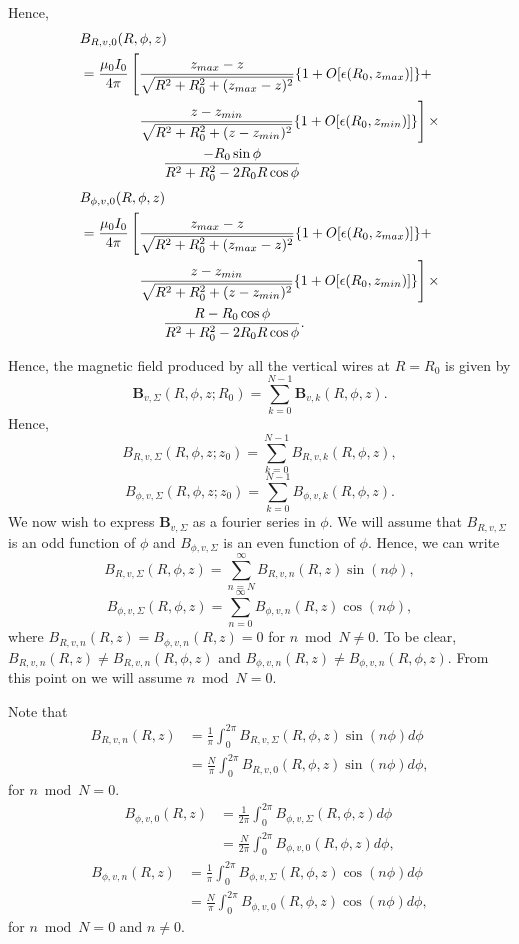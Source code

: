 \documentclass{article}
\let\vec\mathbf
\begin{document}
Hence,
\[
\begin{aligned}
    &B_{R,v,0}(R, \phi, z) \\
   &=\frac{\mu_0 I_0}{4\pi}\left[\frac{z_{max}-z}{\sqrt{R^2+R_0^2+(z_{max}-z)^2}}\qty{1+O[\epsilon(R_0, z_{max})]} + \right.\\
    &\qquad\qquad\left.\frac{z-z_{min}}{\sqrt{R^2+R_0^2+(z-z_{min})^2}}\qty{1+O[\epsilon(R_0, z_{min})]}\right]\times\\
    &\qquad\qquad\qquad\frac{-R_0\sin\phi}{R^2+R_0^2-2R_0R\cos\phi} \\
\end{aligned}
\]
\[
\begin{aligned}
    &B_{\phi,v,0}(R, \phi, z) \\
   &=\frac{\mu_0 I_0}{4\pi}\left[\frac{z_{max}-z}{\sqrt{R^2+R_0^2+(z_{max}-z)^2}}\qty{1+O[\epsilon(R_0, z_{max})]} + \right.\\
    &\qquad\qquad\left.\frac{z-z_{min}}{\sqrt{R^2+R_0^2+(z-z_{min})^2}}\qty{1+O[\epsilon(R_0, z_{min})]}\right]\times\\
    &\qquad\qquad\qquad\frac{R-R_0\cos\phi}{R^2+R_0^2-2R_0R\cos\phi}. \\
\end{aligned}
\]

Hence, the magnetic field produced by all the vertical wires at $R=R_0$ is given by
\[\vec{B}_{v,\Sigma}(R, \phi, z; R_0) = \sum_{k=0}^{N-1}\vec{B}_{v,k}(R, \phi, z).\]
Hence,
\[B_{R, v,\Sigma}(R, \phi, z; z_0) = \sum_{k=0}^{N-1}B_{R, v,k}(R, \phi, z),\]
\[B_{\phi, v,\Sigma}(R, \phi, z; z_0) = \sum_{k=0}^{N-1}B_{\phi, v,k}(R, \phi, z).\]
We now wish to express $\vec{B}_{v,\Sigma}$ as a fourier series in $\phi$.
We will assume that $B_{R, v,\Sigma}$ is an odd function of $\phi$ and
$B_{\phi, v,\Sigma}$ is an even function of $\phi$.
Hence, we can write
\[B_{R, v,\Sigma}(R, \phi, z) = \sum_{n=N}^{\infty}B_{R, v, n}(R, z)\sin(n\phi),\]
\[B_{\phi, v,\Sigma}(R, \phi, z) = \sum_{n=0}^{\infty}B_{\phi, v, n}(R, z)\cos(n\phi),\]
where $B_{R, v, n}(R, z)=B_{\phi, v, n}(R, z)=0$ for $n \bmod N \ne 0$.
To be clear, $B_{R, v, n}(R, z)\ne B_{R, v, n}(R, \phi, z)$ and 
$B_{\phi, v, n}(R, z)\ne B_{\phi, v, n}(R, \phi, z)$.
From this point on we will assume $n \bmod N = 0$.

Note that
\[\begin{aligned}
B_{R, v, n}(R, z)&=\frac{1}{\pi}\int_{0}^{2\pi}B_{R, v,\Sigma}(R, \phi, z)\sin(n\phi)d\phi \\
&= \frac{N}{\pi}\int_0^{2\pi} B_{R, v, 0}(R, \phi, z)\sin(n\phi)d\phi,
\end{aligned}\]
for $n \bmod N = 0$.
\[\begin{aligned}
B_{\phi, v, 0}(R, z)&=\frac{1}{2\pi}\int_{0}^{2\pi}B_{\phi, v,\Sigma}(R, \phi, z)d\phi \\
&= \frac{N}{2\pi}\int_0^{2\pi} B_{\phi, v, 0}(R, \phi, z)d\phi,
\end{aligned}\]
\[\begin{aligned}
B_{\phi, v, n}(R, z)&=\frac{1}{\pi}\int_{0}^{2\pi}B_{\phi, v,\Sigma}(R, \phi, z)\cos(n\phi)d\phi \\
&= \frac{N}{\pi}\int_0^{2\pi} B_{\phi, v, 0}(R, \phi, z)\cos(n\phi)d\phi,
\end{aligned}\]
for $n \bmod N = 0$ and $n\ne0$.
\end{document}
